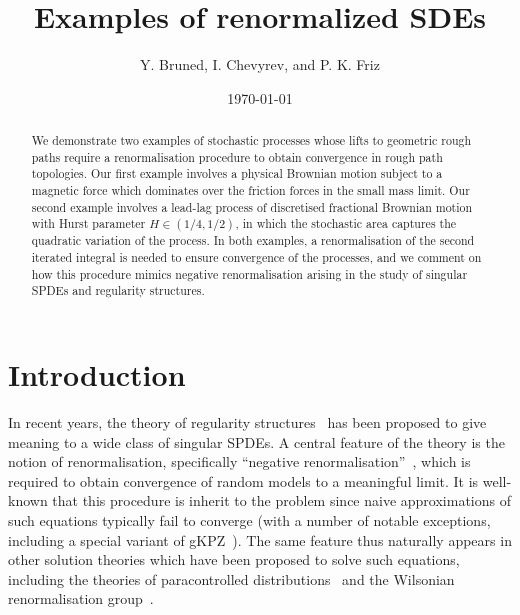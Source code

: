 \documentclass{article}
\begin{document}
\title{Examples of renormalized SDEs}

%
%
\author{Y. Bruned, I. Chevyrev, and P. K. Friz}

\date{\today}




\maketitle

\begin{abstract}
We demonstrate two examples of stochastic processes whose lifts to geometric rough paths require a renormalisation procedure to obtain convergence in rough path topologies. Our first example involves a physical Brownian motion subject to a magnetic force which dominates over the friction forces in the small mass limit. Our second example involves a lead-lag process of discretised fractional Brownian motion with Hurst parameter $H \in (1/4,1/2)$, in which the stochastic area captures the quadratic variation of the process. In both examples, a renormalisation of the second iterated integral is needed to ensure convergence of the processes, and we comment on how this procedure mimics negative renormalisation arising in the study of singular SPDEs and regularity structures.
\end{abstract}




\section{Introduction}

In recent years, the theory of regularity structures~\cite{Hairer14} has been proposed to give meaning to a wide class of singular SPDEs. A central feature of the theory is the notion of renormalisation, specifically ``negative renormalisation''~\cite{BHZ16}, which is required to obtain convergence of random models to a meaningful limit. It is well-known that this procedure is inherit to the problem since naive approximations of such equations typically fail to converge (with a number of notable exceptions, including a special variant of gKPZ~\cite{Hairer16}). The same feature thus naturally appears in other solution theories which have been proposed to solve such equations, including the theories of paracontrolled distributions~\cite{GIP15} and the Wilsonian renormalisation group~\cite{Kupiainen16}.
\end{document}
